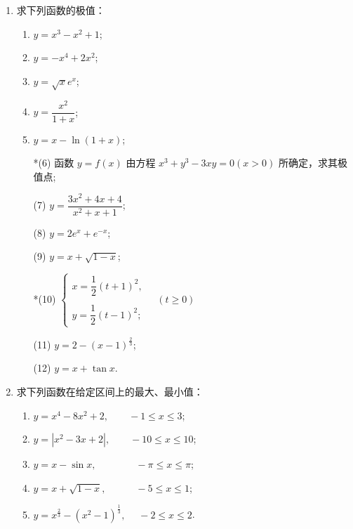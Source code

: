 \begin{enumerate}\setlength{\itemsep}{7pt}
    \item 求下列函数的极值：
    \begin{enumerate}[(1)]\setlength{\itemsep}{5pt}\setlength{\topsep}{15pt}
        \item $y=x^3-x^2+1$;
        \item $y=-x^4+2x^2$;
        \item $y=\sqrt{x}e^x$;
        \item $y=\dfrac{x^2}{1+x}$;
        \item $y=x-\ln (1+x)$;
        \item[*(6)] 函数 $y=f(x)$ 由方程 $x^3+y^3-3xy=0(x>0)$ 所确定，求其极值点;
        \item[(7)] $y=\dfrac{3x^2+4x+4}{x^2+x+1}$;
        \item[(8)] $y=2e^x+e^{-x}$;
        \item[(9)] $y=x+\sqrt{1-x}$;
        \item[*(10)] $\begin{cases}
            x=\dfrac{1}{2}(t+1)^2,\\
            \\
            y=\dfrac{1}{2}(t-1)^2;
        \end{cases}\quad(t\geqslant0)$
        \item[(11)] $y=2-(x-1)^{\frac{2}{3}}$;
        \item[(12)] $y=x+\tan x$. 
    \end{enumerate}

    \item 求下列函数在给定区间上的最大、最小值：
    \begin{enumerate}[(1)]\setlength{\itemsep}{5pt}\setlength{\topsep}{15pt}
        \item $y=x^4-8x^2+2,\qquad-1\leqslant x\leqslant 3$;
        \item $y=|x^2-3x+2|,\qquad-10\leqslant x\leqslant10$;
        \item $y=x-\sin x,\qquad\qquad-\pi\leqslant x\leqslant \pi$;
        \item $y=x+\sqrt{1-x},\quad\qquad -5\leqslant x\leqslant 1$;
        \item $y=x^{\frac{2}{3}}-(x^2-1)^{\frac{1}{3}},\;\quad -2\leqslant x\leqslant 2$.
    \end{enumerate}


\end{enumerate}
